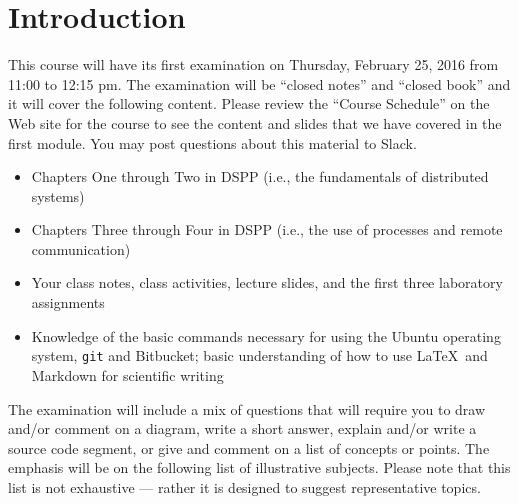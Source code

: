 


\vspace*{-.35in}
\section*{Introduction}
\vspace*{-.05in}

This course will have its first examination on Thursday, February 25, 2016 from 11:00 to 12:15 pm. The examination will
be ``closed notes'' and ``closed book'' and it will cover the following content. Please review the ``Course Schedule''
on the Web site for the course to see the content and slides that we have covered in the first module. You may post
questions about this material to Slack.

\vspace*{-.05in}

\begin{itemize}

  \itemsep 0in

  \item Chapters One through Two in DSPP (i.e., the fundamentals of distributed systems)

  \item Chapters Three through Four in DSPP (i.e., the use of processes and remote communication)

  \item Your class notes, class activities, lecture slides, and the first three laboratory assignments

  \item Knowledge of the basic commands necessary for using the Ubuntu operating system, {\tt git} and Bitbucket; basic
    understanding of how to use \LaTeX~and Markdown for scientific writing

\end{itemize}

\vspace*{-.05in}

\noindent The examination will include a mix of questions that will require you to draw and/or comment on a diagram,
write a short answer, explain and/or write a source code segment, or give and comment on a list of concepts or points.
The emphasis will be on the following list of illustrative subjects. Please note that this list is not exhaustive ---
rather it is designed to suggest representative topics.

